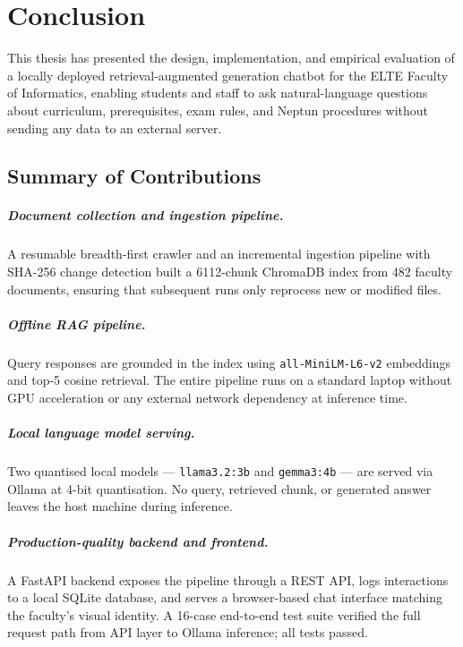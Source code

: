 \chapter{Conclusion}
\label{ch:sum}

This thesis has presented the design, implementation, and empirical evaluation
of a locally deployed retrieval-augmented generation chatbot for the ELTE
Faculty of Informatics, enabling students and staff to ask natural-language
questions about curriculum, prerequisites, exam rules, and Neptun procedures
without sending any data to an external server.

\section{Summary of Contributions}
\label{sec:sum-contributions}

\paragraph{Document collection and ingestion pipeline.}
A resumable breadth-first crawler and an incremental ingestion pipeline with
SHA-256 change detection built a 6112-chunk ChromaDB index from 482 faculty
documents, ensuring that subsequent runs only reprocess new or modified files.

\paragraph{Offline RAG pipeline.}
Query responses are grounded in the index using \texttt{all-MiniLM-L6-v2}
embeddings and top-5 cosine retrieval. The entire pipeline runs on a standard
laptop without GPU acceleration or any external network dependency at inference
time.

\paragraph{Local language model serving.}
Two quantised local models --- \texttt{llama3.2:3b} and \texttt{gemma3:4b} ---
are served via Ollama at 4-bit quantisation. No query, retrieved chunk, or
generated answer leaves the host machine during inference.

\paragraph{Production-quality backend and frontend.}
A FastAPI backend exposes the pipeline through a REST API, logs interactions to
a local SQLite database, and serves a browser-based chat interface matching the
faculty's visual identity. A 16-case end-to-end test suite verified the full
request path from API layer to Ollama inference; all tests passed.

